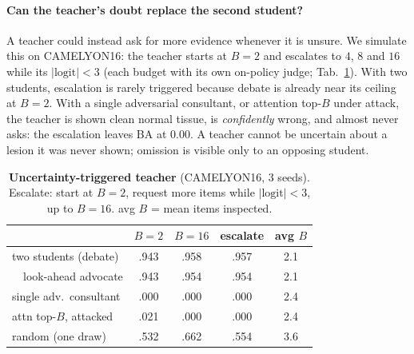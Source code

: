 \documentclass[10pt,twocolumn,letterpaper]{article}
\begin{document}
\paragraph{Can the teacher's doubt replace the second student?} A teacher could instead ask for more evidence whenever it is unsure. We simulate this on CAMELYON16: the teacher starts at $B{=}2$ and escalates to $4$, $8$ and $16$ while its $|\text{logit}|<3$ (each budget with its own on-policy judge; Tab.~\ref{tab:ask}). With two students, escalation is rarely triggered because debate is already near its ceiling at $B{=}2$. With a single adversarial consultant, or attention top-$B$ under attack, the teacher is shown clean normal tissue, is \emph{confidently} wrong, and almost never asks: the escalation leaves BA at 0.00. A teacher cannot be uncertain about a lesion it was never shown; omission is visible only to an opposing student.
\begin{table}[t]\centering\small
\caption{\textbf{Uncertainty-triggered teacher} (CAMELYON16, 3 seeds). Escalate: start at $B{=}2$, request more items while $|\text{logit}|<3$, up to $B{=}16$. avg $B$ = mean items inspected.}\label{tab:ask}
\setlength{\tabcolsep}{3pt}
\begin{tabular}{@{}lcccc@{}}\toprule
 & $B{=}2$ & $B{=}16$ & escalate & avg $B$\\\midrule
two students (debate) & .943 & .958 & .957 & 2.1\\
\ \ look-ahead advocate & .943 & .954 & .954 & 2.1\\
single adv.\ consultant & .000 & .000 & .000 & 2.4\\
attn top-$B$, attacked & .021 & .000 & .000 & 2.4\\
random (one draw) & .532 & .662 & .554 & 3.6\\\bottomrule
\end{tabular}\end{table}
\end{document}
